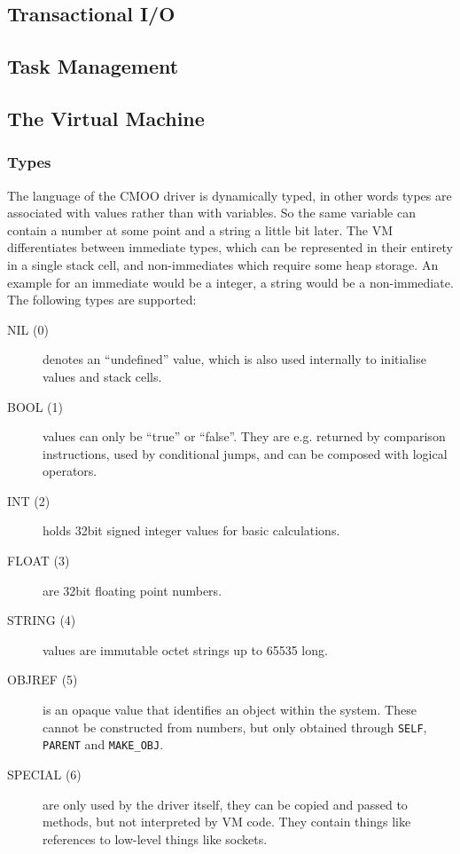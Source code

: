 \documentclass[12pt,a4paper]{article}
\begin{document}
\subsection{Transactional I/O}\label{sec:transactional_io}

\subsection{Task Management}\label{sec:task_mgmt}

\subsection{The Virtual Machine}\label{sec:virtual_machine}

\subsubsection{Types}\label{sec:types}

The language of the CMOO driver is dynamically typed, in other words types are associated with values rather than with variables. So the same variable can contain a number at some point and a string a little bit later. The VM differentiates between immediate types, which can be represented in their entirety in a single stack cell, and non-immediates which require some heap storage. An example for an immediate would be a integer, a string would be a non-immediate. The following types are supported:

\begin{description}
\item[NIL (0)] denotes an ``undefined'' value, which is also used internally to initialise values and stack cells.  
\item[BOOL (1)] values can only be ``true'' or ``false''. They are e.g. returned by comparison instructions, used by conditional jumps, and can be composed with logical operators.
\item[INT (2)] holds 32bit signed integer values for basic calculations.
\item[FLOAT (3)] are 32bit floating point numbers.
\item[STRING (4)] values are immutable octet strings up to 65535 long.  
\item[OBJREF (5)] is an opaque value that identifies an object within the system. These cannot be constructed from numbers, but only obtained through \verb|SELF|, \verb|PARENT| and \verb|MAKE_OBJ|. 
\item[SPECIAL (6)] are only used by the driver itself, they can be copied and passed to methods, but not interpreted by VM code. They contain things like references to low-level things like sockets.
\end{description}
\end{document}
